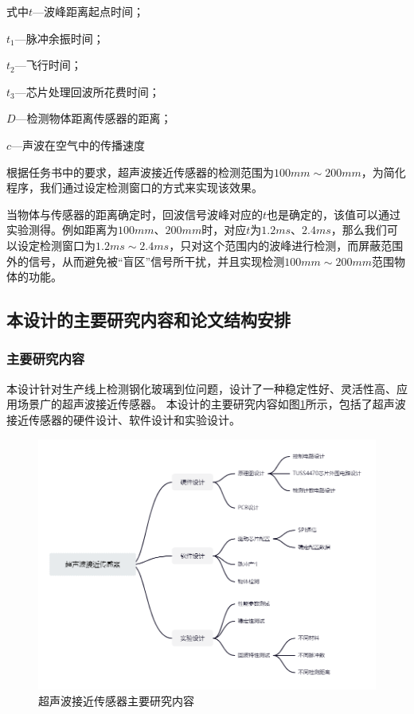 式中\quad$t$---波峰距离起点时间；\par
    \quad$t_1$---脉冲余振时间；\par
    \quad$t_2$---飞行时间；\par    
    \quad$t_3$---芯片处理回波所花费时间；\par 
    \quad$D$---检测物体距离传感器的距离；\par  
    \quad$c$---声波在空气中的传播速度\par    
    根据任务书中的要求，超声波接近传感器的检测范围为$100mm\sim200mm$，为简化程序，我们通过设定检测窗口的方式来实现该效果。\par  
    当物体与传感器的距离确定时，回波信号波峰对应的$t$也是确定的，该值可以通过实验测得。例如距离为$100mm$、$200mm$时，对应$t$为$1.2ms$、$2.4ms$，那么我们可以设定检测窗口为$1.2ms\sim2.4ms$，只对这个范围内的波峰进行检测，而屏蔽范围外的信号，从而避免被“盲区”信号所干扰，并且实现检测$100mm\sim200mm$范围物体的功能。\par
    
    
\subsection{本设计的主要研究内容和论文结构安排}
\subsubsection{主要研究内容}
本设计针对生产线上检测钢化玻璃到位问题，设计了一种稳定性好、灵活性高、应用场景广的超声波接近传感器。
本设计的主要研究内容如图\ref{超声波接近传感器主要研究内容}所示，包括了超声波接近传感器的硬件设计、软件设计和实验设计。
\begin{figure}[ht]
	\centering
	\includegraphics[width=12cm]{figure/overall designment.png}
	\caption{超声波接近传感器主要研究内容}
	\label{超声波接近传感器主要研究内容}
\end{figure}

